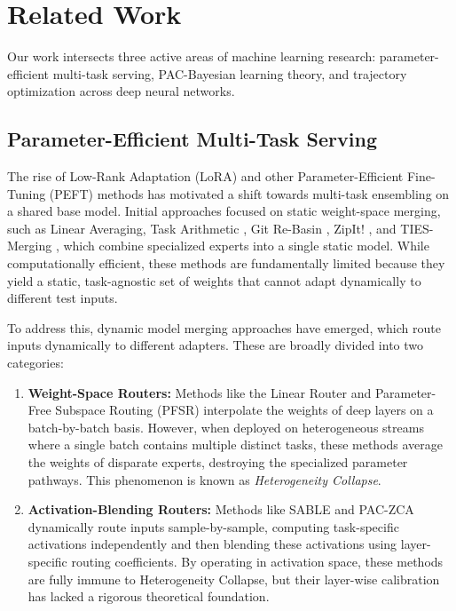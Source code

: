 \section{Related Work}
\label{sec:related_work}

Our work intersects three active areas of machine learning research: parameter-efficient multi-task serving, PAC-Bayesian learning theory, and trajectory optimization across deep neural networks.

\subsection{Parameter-Efficient Multi-Task Serving}
The rise of Low-Rank Adaptation (LoRA) \cite{hu21lora} and other Parameter-Efficient Fine-Tuning (PEFT) methods has motivated a shift towards multi-task ensembling on a shared base model. Initial approaches focused on static weight-space merging, such as Linear Averaging, Task Arithmetic \cite{mitchell80}, Git Re-Basin \cite{ainsworth2022git}, ZipIt! \cite{stoica2023zipit}, and TIES-Merging \cite{yadav23ties}, which combine specialized experts into a single static model. While computationally efficient, these methods are fundamentally limited because they yield a static, task-agnostic set of weights that cannot adapt dynamically to different test inputs.

To address this, dynamic model merging approaches have emerged, which route inputs dynamically to different adapters. These are broadly divided into two categories:
\begin{enumerate}
    \item \textbf{Weight-Space Routers:} Methods like the Linear Router and Parameter-Free Subspace Routing (PFSR) interpolate the weights of deep layers on a batch-by-batch basis. However, when deployed on heterogeneous streams where a single batch contains multiple distinct tasks, these methods average the weights of disparate experts, destroying the specialized parameter pathways. This phenomenon is known as \emph{Heterogeneity Collapse}.
    \item \textbf{Activation-Blending Routers:} Methods like SABLE and PAC-ZCA dynamically route inputs sample-by-sample, computing task-specific activations independently and then blending these activations using layer-specific routing coefficients. By operating in activation space, these methods are fully immune to Heterogeneity Collapse, but their layer-wise calibration has lacked a rigorous theoretical foundation.
\end{enumerate}

